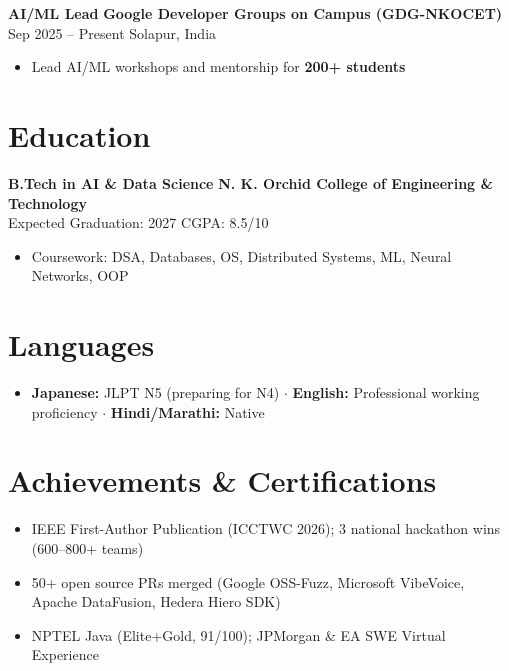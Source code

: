 \documentclass[9pt, letterpaper]{article}
\begin{document}
\textbf{AI/ML Lead} \hfill \textbf{Google Developer Groups on Campus (GDG-NKOCET)}\\
Sep 2025 -- Present \hfill Solapur, India
\begin{itemize}
  \item Lead AI/ML workshops and mentorship for \textbf{200+ students}
\end{itemize}

\section{Education}
\textbf{B.Tech in AI \& Data Science} \hfill \textbf{N. K. Orchid College of Engineering \& Technology}\\
Expected Graduation: 2027 \hfill CGPA: 8.5/10
\begin{itemize}
  \item Coursework: DSA, Databases, OS, Distributed Systems, ML, Neural Networks, OOP
\end{itemize}

\section{Languages}
\begin{itemize}
  \item \textbf{Japanese:} JLPT N5 (preparing for N4) $\cdot$ \textbf{English:} Professional working proficiency $\cdot$ \textbf{Hindi/Marathi:} Native
\end{itemize}

\section{Achievements \& Certifications}
\begin{itemize}
  \item IEEE First-Author Publication (ICCTWC 2026); 3 national hackathon wins (600--800+ teams)
  \item 50+ open source PRs merged (Google OSS-Fuzz, Microsoft VibeVoice, Apache DataFusion, Hedera Hiero SDK)
  \item NPTEL Java (Elite+Gold, 91/100); JPMorgan \& EA SWE Virtual Experience
\end{itemize}

\end{document}
